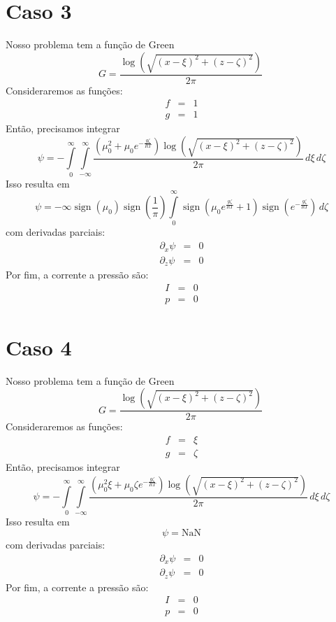 \documentclass[12pt]{article}
\def\be{\begin{equation}}
\def\ee{\end{equation}}
\def\bea{\begin{eqnarray*}}
\def\eea{\end{eqnarray*}}
\theoremstyle{definition}
\numberwithin{equation}{section}
\begin{document}
        \section{Caso 3}
        Nosso problema tem a função de Green
        \be
            G = \frac{\log{\left(\sqrt{\left(x - \xi\right)^{2} + \left(z - \zeta\right)^{2}} \right)}}{2 \pi}\
        \ee
        Consideraremos as funções:
        \bea
            f &=& 1 \\
            g &=& 1
        \eea
        Então, precisamos integrar
        \be
            \psi = - \int\limits_{0}^{\infty}\int\limits_{-\infty}^{\infty} \frac{\left(\mu_{0}^{2} + \mu_{0} e^{- \frac{g \zeta}{R T}}\right) \log{\left(\sqrt{\left(x - \xi\right)^{2} + \left(z - \zeta\right)^{2}} \right)}}{2 \pi}\, d\xi\, d\zeta
        \ee
        Isso resulta em
        \be
            \psi = - \infty \operatorname{sign}{\left(\mu_{0} \right)} \operatorname{sign}{\left(\frac{1}{\pi} \right)} \int\limits_{0}^{\infty} \operatorname{sign}{\left(\mu_{0} e^{\frac{g \zeta}{R T}} + 1 \right)} \operatorname{sign}{\left(e^{- \frac{g \zeta}{R T}} \right)}\, d\zeta
        \ee
        com derivadas parciais:
        \bea
            \partial_x\psi &=& 0 \\
            \partial_z\psi &=& 0
        \eea
        Por fim, a corrente a pressão são:
        \bea
            I &=& 0 \\
            p &=& 0
        \eea
        

        \section{Caso 4}
        Nosso problema tem a função de Green
        \be
            G = \frac{\log{\left(\sqrt{\left(x - \xi\right)^{2} + \left(z - \zeta\right)^{2}} \right)}}{2 \pi}\
        \ee
        Consideraremos as funções:
        \bea
            f &=& \xi \\
            g &=& \zeta
        \eea
        Então, precisamos integrar
        \be
            \psi = - \int\limits_{0}^{\infty}\int\limits_{-\infty}^{\infty} \frac{\left(\mu_{0}^{2} \xi + \mu_{0} \zeta e^{- \frac{g \zeta}{R T}}\right) \log{\left(\sqrt{\left(x - \xi\right)^{2} + \left(z - \zeta\right)^{2}} \right)}}{2 \pi}\, d\xi\, d\zeta
        \ee
        Isso resulta em
        \be
            \psi = \text{NaN}
        \ee
        com derivadas parciais:
        \bea
            \partial_x\psi &=& 0 \\
            \partial_z\psi &=& 0
        \eea
        Por fim, a corrente a pressão são:
        \bea
            I &=& 0 \\
            p &=& 0
        \eea
        
\end{document}

